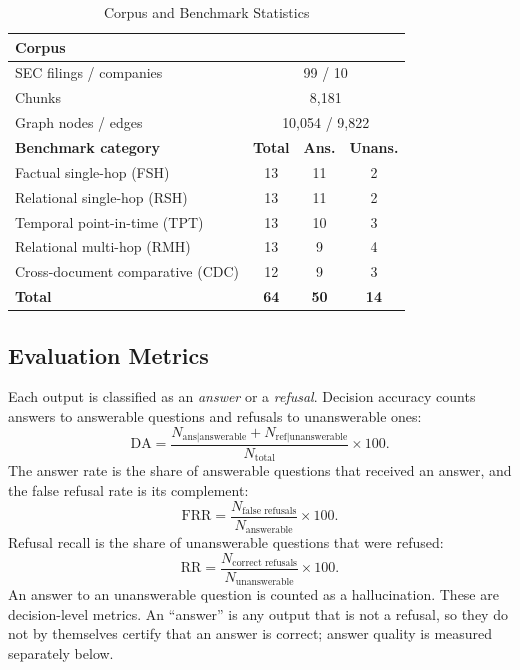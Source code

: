 \documentclass[conference]{IEEEtran}
\begin{document}
\begin{table}[t]
\caption{Corpus and Benchmark Statistics}
\label{tab:data}
\centering
\footnotesize
\begin{tabular}{lccc}
\toprule
\multicolumn{4}{l}{\textbf{Corpus}}\\
\midrule
SEC filings / companies & \multicolumn{3}{c}{99 / 10}\\
Chunks & \multicolumn{3}{c}{8,181}\\
Graph nodes / edges & \multicolumn{3}{c}{10,054 / 9,822}\\
\midrule
\textbf{Benchmark category} & \textbf{Total} & \textbf{Ans.} & \textbf{Unans.}\\
\midrule
Factual single-hop (FSH) & 13 & 11 & 2\\
Relational single-hop (RSH) & 13 & 11 & 2\\
Temporal point-in-time (TPT) & 13 & 10 & 3\\
Relational multi-hop (RMH) & 13 & 9 & 4\\
Cross-document comparative (CDC) & 12 & 9 & 3\\
\midrule
\textbf{Total} & \textbf{64} & \textbf{50} & \textbf{14}\\
\bottomrule
\end{tabular}
\end{table}

\subsection{Evaluation Metrics}
Each output is classified as an \textit{answer} or a \textit{refusal}. Decision accuracy counts answers to answerable questions and refusals to unanswerable ones:
\begin{equation}
\mathrm{DA} = \frac{N_{\text{ans}|\text{answerable}} + N_{\text{ref}|\text{unanswerable}}}{N_{\text{total}}}\times100.
\end{equation}
The answer rate is the share of answerable questions that received an answer, and the false refusal rate is its complement:
\begin{equation}
\mathrm{FRR} = \frac{N_{\text{false refusals}}}{N_{\text{answerable}}}\times100.
\end{equation}
Refusal recall is the share of unanswerable questions that were refused:
\begin{equation}
\mathrm{RR} = \frac{N_{\text{correct refusals}}}{N_{\text{unanswerable}}}\times100.
\end{equation}
An answer to an unanswerable question is counted as a hallucination. These are decision-level metrics. An ``answer'' is any output that is not a refusal, so they do not by themselves certify that an answer is correct; answer quality is measured separately below.
\end{document}
